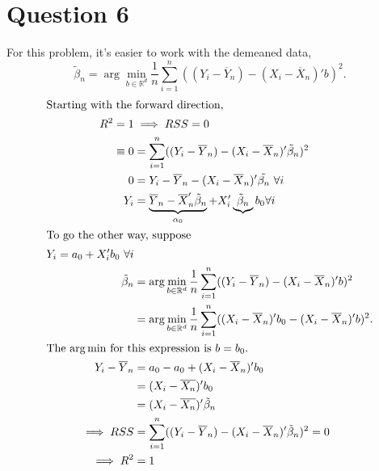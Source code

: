 \documentclass[11pt]{article}
\newcommand{\R}{\mathbb{R}}
\begin{document}
\section{Question 6}
\label{sec:orgc745bfc}
For this problem, it's easier to work with the demeaned data, 
\[
  \tilde{\beta}_n = \arg \min_{b \in \R^d} \frac{1}{n} \sum^n_{i = 1} ((Y_i - \overline{Y}_n) - (X_i - \overline{X}_n)' b)^2.
  \]
\begin{align*}
\intertext{Starting with the forward direction,}
R^2 = 1 & \implies RSS = 0\\
\equiv 0 &= \sum^n_{i = 1} ((Y_i - \overline{Y}_n) - (X_i - \overline{X}_n)' \tilde{\beta}_n)^2\\
0 &= Y_i - \overline{Y}_n - (X_i - \overline{X}_n)' \tilde{\beta_n}\ \forall i\\
Y_i &= \underbrace{\overline{Y}_n - \overline{X}_n ' \tilde{\beta}_n}_{\alpha_0} + X_i' \underbrace{\tilde{\beta}_n}{b_0} \forall i\\
\intertext{To go the other way, suppose}
Y_i = a_0 + X_i' b_0 \ \forall i\\
\tilde{\beta}_n &= \arg \min_{b \in \R^d} \frac{1}{n} \sum^n_{i = 1} ((Y_i - \overline{Y}_n) - (X_i - \overline{X}_n)' b)^2\\
&= \arg \min_{b \in \R^d} \frac{1}{n} \sum^n_{i = 1} ((X_i - \overline{X}_n)' b_0 - (X_i - \overline{X}_n)' b)^2.\\
\intertext{The $\arg \min$ for this expression is $b = b_0$.}
Y_i - \overline{Y}_n &= a_0 - a_0 + (X_i - \overline{X}_n)' b_0\\
&= (X_i - \overline{X_n})' b_0\\
&= (X_i - \overline{X_n})' \tilde{\beta}_n\\
\implies RSS &= \sum^n_{i = 1} ((Y_i - \overline{Y}_n) - (X_i - \overline{X}_n)' \tilde{\beta}_n)^2 = 0\\
\implies R^2 &= 1
\end{align*}
\end{document}
